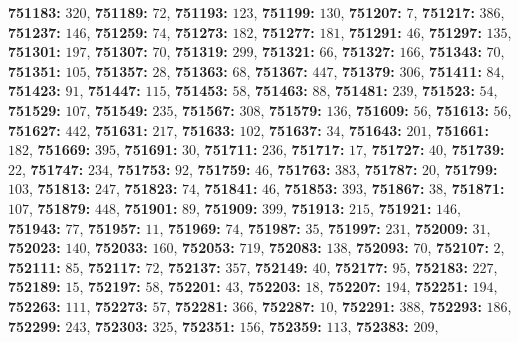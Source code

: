 \textsf{\bfseries 751183:} $320$, \textsf{\bfseries 751189:} $72$, \textsf{\bfseries 751193:} $123$, \textsf{\bfseries 751199:} $130$, \textsf{\bfseries 751207:} $7$, \textsf{\bfseries 751217:} $386$, \textsf{\bfseries 751237:} $146$, \textsf{\bfseries 751259:} $74$, \textsf{\bfseries 751273:} $182$, \textsf{\bfseries 751277:} $181$, \textsf{\bfseries 751291:} $46$, \textsf{\bfseries 751297:} $135$, \textsf{\bfseries 751301:} $197$, \textsf{\bfseries 751307:} $70$, \textsf{\bfseries 751319:} $299$, \textsf{\bfseries 751321:} $66$, \textsf{\bfseries 751327:} $166$, \textsf{\bfseries 751343:} $70$, \textsf{\bfseries 751351:} $105$, \textsf{\bfseries 751357:} $28$, \textsf{\bfseries 751363:} $68$, \textsf{\bfseries 751367:} $447$, \textsf{\bfseries 751379:} $306$, \textsf{\bfseries 751411:} $84$, \textsf{\bfseries 751423:} $91$, \textsf{\bfseries 751447:} $115$, \textsf{\bfseries 751453:} $58$, \textsf{\bfseries 751463:} $88$, \textsf{\bfseries 751481:} $239$, \textsf{\bfseries 751523:} $54$, \textsf{\bfseries 751529:} $107$, \textsf{\bfseries 751549:} $235$, \textsf{\bfseries 751567:} $308$, \textsf{\bfseries 751579:} $136$, \textsf{\bfseries 751609:} $56$, \textsf{\bfseries 751613:} $56$, \textsf{\bfseries 751627:} $442$, \textsf{\bfseries 751631:} $217$, \textsf{\bfseries 751633:} $102$, \textsf{\bfseries 751637:} $34$, \textsf{\bfseries 751643:} $201$, \textsf{\bfseries 751661:} $182$, \textsf{\bfseries 751669:} $395$, \textsf{\bfseries 751691:} $30$, \textsf{\bfseries 751711:} $236$, \textsf{\bfseries 751717:} $17$, \textsf{\bfseries 751727:} $40$, \textsf{\bfseries 751739:} $22$, \textsf{\bfseries 751747:} $234$, \textsf{\bfseries 751753:} $92$, \textsf{\bfseries 751759:} $46$, \textsf{\bfseries 751763:} $383$, \textsf{\bfseries 751787:} $20$, \textsf{\bfseries 751799:} $103$, \textsf{\bfseries 751813:} $247$, \textsf{\bfseries 751823:} $74$, \textsf{\bfseries 751841:} $46$, \textsf{\bfseries 751853:} $393$, \textsf{\bfseries 751867:} $38$, \textsf{\bfseries 751871:} $107$, \textsf{\bfseries 751879:} $448$, \textsf{\bfseries 751901:} $89$, \textsf{\bfseries 751909:} $399$, \textsf{\bfseries 751913:} $215$, \textsf{\bfseries 751921:} $146$, \textsf{\bfseries 751943:} $77$, \textsf{\bfseries 751957:} $11$, \textsf{\bfseries 751969:} $74$, \textsf{\bfseries 751987:} $35$, \textsf{\bfseries 751997:} $231$, \textsf{\bfseries 752009:} $31$, \textsf{\bfseries 752023:} $140$, \textsf{\bfseries 752033:} $160$, \textsf{\bfseries 752053:} $719$, \textsf{\bfseries 752083:} $138$, \textsf{\bfseries 752093:} $70$, \textsf{\bfseries 752107:} $2$, \textsf{\bfseries 752111:} $85$, \textsf{\bfseries 752117:} $72$, \textsf{\bfseries 752137:} $357$, \textsf{\bfseries 752149:} $40$, \textsf{\bfseries 752177:} $95$, \textsf{\bfseries 752183:} $227$, \textsf{\bfseries 752189:} $15$, \textsf{\bfseries 752197:} $58$, \textsf{\bfseries 752201:} $43$, \textsf{\bfseries 752203:} $18$, \textsf{\bfseries 752207:} $194$, \textsf{\bfseries 752251:} $194$, \textsf{\bfseries 752263:} $111$, \textsf{\bfseries 752273:} $57$, \textsf{\bfseries 752281:} $366$, \textsf{\bfseries 752287:} $10$, \textsf{\bfseries 752291:} $388$, \textsf{\bfseries 752293:} $186$, \textsf{\bfseries 752299:} $243$, \textsf{\bfseries 752303:} $325$, \textsf{\bfseries 752351:} $156$, \textsf{\bfseries 752359:} $113$, \textsf{\bfseries 752383:} $209$, 
